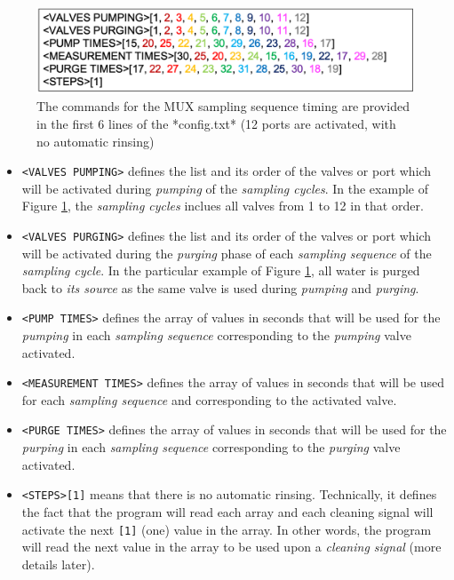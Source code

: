 \documentclass[]{book}
\providecommand{\tightlist}{%
  \setlength{\itemsep}{0pt}\setlength{\parskip}{0pt}}
\begin{document}
\begin{figure}

\includegraphics[width=0.6\linewidth]{pictures/ConfigBasicMUXPart} \hfill{}

\caption{The commands for the MUX sampling sequence timing are provided in the first 6 lines of the *config.txt* (12 ports are activated, with no automatic rinsing)}\label{fig:ConfigBasicMUXPart}
\end{figure}

\begin{itemize}
\tightlist
\item
  \texttt{\textless{}VALVES\ PUMPING\textgreater{}} defines the list and its order of the valves or port which will be activated during \emph{pumping} of the \emph{sampling cycles}. In the example of Figure \ref{fig:ConfigBasicMUXPart}, the \emph{sampling cycles} inclues all valves from 1 to 12 in that order.
\item
  \texttt{\textless{}VALVES\ PURGING\textgreater{}} defines the list and its order of the valves or port which will be activated during the \emph{purging} phase of each \emph{sampling sequence} of the \emph{sampling cycle}. In the particular example of Figure \ref{fig:ConfigBasicMUXPart}, all water is purged back to \emph{its source} as the same valve is used during \emph{pumping} and \emph{purging}.
\item
  \texttt{\textless{}PUMP\ TIMES\textgreater{}} defines the array of values in seconds that will be used for the \emph{pumping} in each \emph{sampling sequence} corresponding to the \emph{pumping} valve activated.
\item
  \texttt{\textless{}MEASUREMENT\ TIMES\textgreater{}} defines the array of values in seconds that will be used for each \emph{sampling sequence} and corresponding to the activated valve.
\item
  \texttt{\textless{}PURGE\ TIMES\textgreater{}} defines the array of values in seconds that will be used for the \emph{purping} in each \emph{sampling sequence} corresponding to the \emph{purging} valve activated.
\item
  \texttt{\textless{}STEPS\textgreater{}{[}1{]}} means that there is no automatic rinsing. Technically, it defines the fact that the program will read each array and each cleaning signal will activate the next \texttt{{[}1{]}} (one) value in the array. In other words, the program will read the next value in the array to be used upon a \emph{cleaning signal} (more details later).
\end{itemize}
\end{document}
